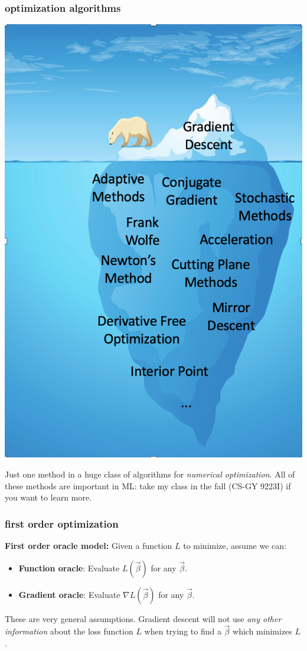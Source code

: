 \documentclass[handout,compress]{beamer}
\begin{document}
\begin{frame}
	\frametitle{optimization algorithms}
	
	\begin{center}
		\includegraphics[height=.7\textheight]{iceberg.png}
		
		Just one method in a huge class of algorithms for \emph{numerical optimization}. All of these methods are important in ML: take my class in the fall (CS-GY 9223I) if you want to learn more. 
	\end{center}
\end{frame}


\begin{frame}
	\frametitle{first order optimization}
	\textbf{First order oracle model:} Given a function $L$ to minimize, assume we can:
	\begin{itemize}
		\item \textbf{Function oracle}: Evaluate $L(\vec{\beta})$ for any $\vec{\beta}$. 
		\item \textbf{Gradient oracle}: Evaluate $\nabla L(\vec{\beta})$ for any $\vec{\beta}$.
	\end{itemize}

	These are very general assumptions. Gradient descent will not use \emph{any other information} about the loss function $L$ when trying to find a $\vec{\beta}$ which minimizes $L$.
\end{frame}
\end{document}
